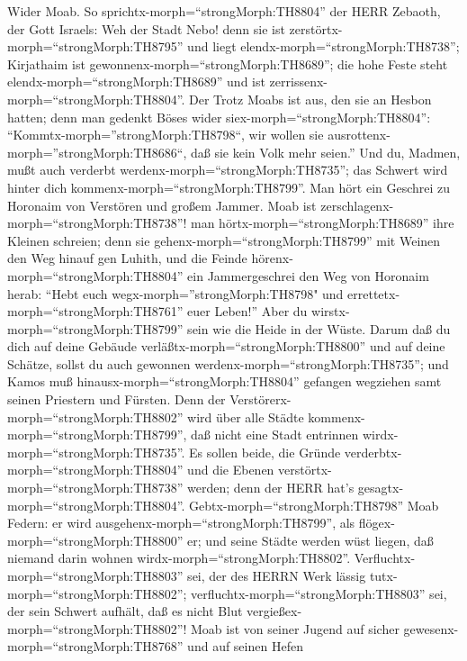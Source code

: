  Wider Moab. So sprichtx-morph=``strongMorph:TH8804'' der
HERR Zebaoth, der Gott Israels: Weh der Stadt Nebo! denn sie ist
zerstörtx-morph=``strongMorph:TH8795'' und liegt
elendx-morph=``strongMorph:TH8738''; Kirjathaim ist
gewonnenx-morph=``strongMorph:TH8689''; die hohe Feste steht
elendx-morph=``strongMorph:TH8689'' und ist
zerrissenx-morph=``strongMorph:TH8804''.  Der Trotz Moabs
ist aus, den sie an Hesbon hatten; denn man gedenkt Böses wider
siex-morph=``strongMorph:TH8804'':
``Kommtx-morph=''strongMorph:TH8798``, wir wollen sie
ausrottenx-morph=''strongMorph:TH8686``, daß sie kein Volk mehr seien.''
Und du, Madmen, mußt auch verderbt werdenx-morph=``strongMorph:TH8735'';
das Schwert wird hinter dich kommenx-morph=``strongMorph:TH8799''.
 Man hört ein Geschrei zu Horonaim von Verstören und großem
Jammer.  Moab ist zerschlagenx-morph=``strongMorph:TH8738''!
man hörtx-morph=``strongMorph:TH8689'' ihre Kleinen schreien;
 denn sie gehenx-morph=``strongMorph:TH8799'' mit Weinen den
Weg hinauf gen Luhith, und die Feinde
hörenx-morph=``strongMorph:TH8804'' ein Jammergeschrei den Weg von
Horonaim herab:  ``Hebt euch
wegx-morph=''strongMorph:TH8798" und
errettetx-morph=``strongMorph:TH8761'' euer Leben!'' Aber du
wirstx-morph=``strongMorph:TH8799'' sein wie die Heide in der Wüste.
 Darum daß du dich auf deine Gebäude
verläßtx-morph=``strongMorph:TH8800'' und auf deine Schätze, sollst du
auch gewonnen werdenx-morph=``strongMorph:TH8735''; und Kamos muß
hinausx-morph=``strongMorph:TH8804'' gefangen wegziehen samt seinen
Priestern und Fürsten.  Denn der
Verstörerx-morph=``strongMorph:TH8802'' wird über alle Städte
kommenx-morph=``strongMorph:TH8799'', daß nicht eine Stadt entrinnen
wirdx-morph=``strongMorph:TH8735''. Es sollen beide, die Gründe
verderbtx-morph=``strongMorph:TH8804'' und die Ebenen
verstörtx-morph=``strongMorph:TH8738'' werden; denn der HERR hat's
gesagtx-morph=``strongMorph:TH8804''. 
Gebtx-morph=``strongMorph:TH8798'' Moab Federn: er wird
ausgehenx-morph=``strongMorph:TH8799'', als
flögex-morph=``strongMorph:TH8800'' er; und seine Städte werden wüst
liegen, daß niemand darin wohnen wirdx-morph=``strongMorph:TH8802''.
 Verfluchtx-morph=``strongMorph:TH8803'' sei, der des HERRN
Werk lässig tutx-morph=``strongMorph:TH8802'';
verfluchtx-morph=``strongMorph:TH8803'' sei, der sein Schwert aufhält,
daß es nicht Blut vergießex-morph=``strongMorph:TH8802''! 
Moab ist von seiner Jugend auf sicher
gewesenx-morph=``strongMorph:TH8768'' und auf seinen Hefen
